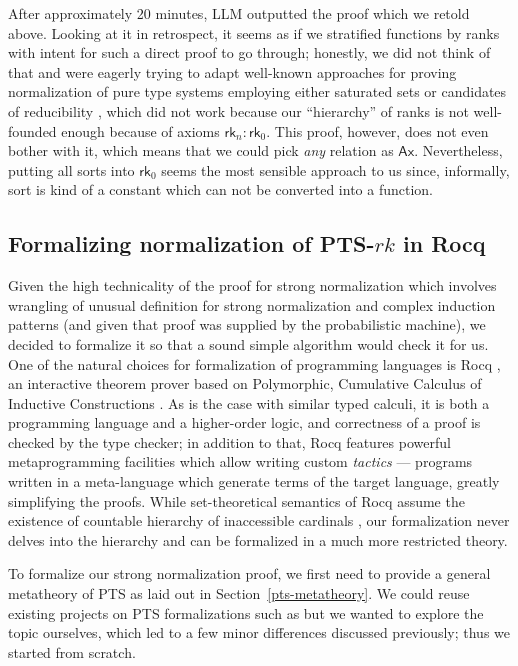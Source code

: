 \documentclass{article}
\theoremstyle{definition}
\theoremstyle{remark}
\begin{document}
After approximately 20 minutes, LLM outputted the proof
which we retold above. Looking at it in retrospect, it
seems as if we stratified functions by ranks with
intent for such a direct proof to go through; honestly,
we did not think of that and were eagerly trying to
adapt well-known approaches for proving normalization
of pure type systems employing either saturated sets or
candidates of reducibility \cite{tait1967intensional,
girard1972interpretation,girard1989proofs,
geuvers1991modular}, which did not work because our
``hierarchy'' of ranks is not well-founded enough
because of axioms $\mathsf{rk}_n:\mathsf{rk}_0$. This
proof, however, does not even bother with it, which
means that we could pick \emph{any} relation as
$\mathsf{Ax}$. Nevertheless, putting all sorts into
$\mathsf{rk}_0$ seems the most sensible approach to us
since, informally, sort is kind of a constant which can
not be converted into a function.

\subsection
{Formalizing normalization of
PTS-\texorpdfstring{$rk$}{rk} in Rocq}
\label{formalization}

Given the high technicality of the proof for strong
normalization which involves wrangling of unusual
definition for strong normalization and complex
induction patterns (and given that proof was supplied
by the probabilistic machine), we decided to formalize
it so that a sound simple algorithm would check it for
us. One of the natural choices for formalization of
programming languages is Rocq \cite{rocq2025manual,
bertot2004interactive}, an interactive theorem prover
based on Polymorphic, Cumulative Calculus of Inductive
Constructions \cite{sozeau2014universe,
timany2018cumulative}. As is the case with similar
typed calculi, it is both a programming language and a
higher-order logic, and correctness of a proof is
checked by the type checker; in addition to that, Rocq
features powerful metaprogramming facilities which
allow writing custom \emph{tactics} --- programs
written in a meta-language which generate terms of the
target language, greatly simplifying the proofs. While
set-theoretical semantics of Rocq assume the existence
of countable hierarchy of inaccessible cardinals
\cite{werner1997sets,timany2017consistency}, our
formalization never delves into the hierarchy and can
be formalized in a much more restricted theory.

To formalize our strong normalization proof, we first
need to provide a general metatheory of PTS as laid out
in Section~\ref{pts-metatheory}. We could reuse
existing projects on PTS formalizations such as
\cite{siles2012pure,adams2006pure,barras1997coqencoq,
felicissimo2024generic} but we wanted to explore the
topic ourselves, which led to a few minor differences
discussed previously; thus we started from scratch.
\end{document}

